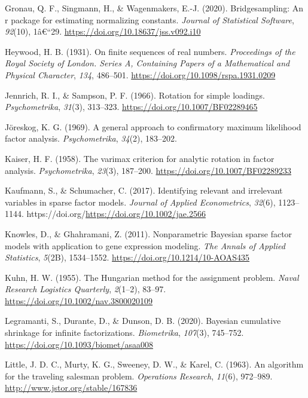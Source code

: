 \documentclass[
  man,
  longtable,
  nolmodern,
  notxfonts,
  notimes,
  colorlinks=true,linkcolor=blue,citecolor=blue,urlcolor=blue]{apa7}
\newlength{\cslhangindent}
\newenvironment{CSLReferences}[2] %
 {\begin{list}{}{%
  \setlength{\itemindent}{0pt}
  \setlength{\leftmargin}{0pt}
  \setlength{\parsep}{0pt}
  \ifodd #1
   \setlength{\leftmargin}{\cslhangindent}
   \setlength{\itemindent}{-1\cslhangindent}
  \fi
  \setlength{\itemsep}{#2\baselineskip}}}
 {\end{list}}
\theoremstyle{plain}
\theoremstyle{plain}
\theoremstyle{remark}
\begin{document}
\begin{CSLReferences}{1}{0}
Gronau, Q. F., Singmann, H., \& Wagenmakers, E.-J. (2020).
Bridgesampling: An r package for estimating normalizing constants.
\emph{Journal of Statistical Software}, \emph{92}(10), 1â€``29.
\url{https://doi.org/10.18637/jss.v092.i10}

Heywood, H. B. (1931). On finite sequences of real numbers.
\emph{Proceedings of the Royal Society of London. Series A, Containing
Papers of a Mathematical and Physical Character}, \emph{134}, 486--501.
\url{https://doi.org/10.1098/rspa.1931.0209}

Jennrich, R. I., \& Sampson, P. F. (1966). Rotation for simple loadings.
\emph{Psychometrika}, \emph{31}(3), 313--323.
\url{https://doi.org/10.1007/BF02289465}

Jöreskog, K. G. (1969). A general approach to confirmatory maximum
likelihood factor analysis. \emph{Psychometrika}, \emph{34}(2),
183--202.

Kaiser, H. F. (1958). The varimax criterion for analytic rotation in
factor analysis. \emph{Psychometrika}, \emph{23}(3), 187--200.
\url{https://doi.org/10.1007/BF02289233}

Kaufmann, S., \& Schumacher, C. (2017). Identifying relevant and
irrelevant variables in sparse factor models. \emph{Journal of Applied
Econometrics}, \emph{32}(6), 1123--1144.
https://doi.org/\url{https://doi.org/10.1002/jae.2566}

Knowles, D., \& Ghahramani, Z. (2011). {Nonparametric Bayesian sparse
factor models with application to gene expression modeling}. \emph{The
Annals of Applied Statistics}, \emph{5}(2B), 1534--1552.
\url{https://doi.org/10.1214/10-AOAS435}

Kuhn, H. W. (1955). The {Hungarian} method for the assignment problem.
\emph{Naval Research Logistics Quarterly}, \emph{2}(1--2), 83--97.
\url{https://doi.org/10.1002/nav.3800020109}

Legramanti, S., Durante, D., \& Dunson, D. B. (2020). Bayesian
cumulative shrinkage for infinite factorizations. \emph{Biometrika},
\emph{107}(3), 745--752. \url{https://doi.org/10.1093/biomet/asaa008}

Little, J. D. C., Murty, K. G., Sweeney, D. W., \& Karel, C. (1963). An
algorithm for the traveling salesman problem. \emph{Operations
Research}, \emph{11}(6), 972--989.
\url{http://www.jstor.org/stable/167836}


\end{CSLReferences}
\end{document}

